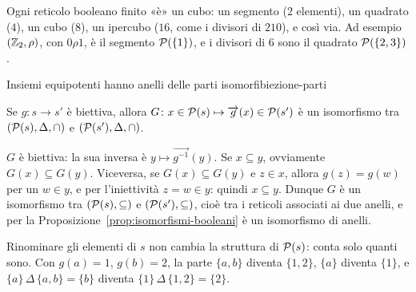 \begin{spiegazione}
    Ogni reticolo booleano finito «è» un cubo: un segmento ($2$ elementi), un quadrato ($4$), un cubo ($8$), un ipercubo ($16$, come i divisori
    di $210$), e così via. Ad esempio $(\mathbb{Z}_2, \rho)$, con $0 \rho 1$, è il segmento $\mathcal{P}(\{1\})$, e i divisori di $6$ sono il quadrato $\mathcal{P}(\{2, 3\})$.
\end{spiegazione}

\begin{concetto}
\begin{Lemma}{Insiemi equipotenti hanno anelli delle parti isomorfi}{biezione-parti}
    \begin{prerequisiti}
    \end{prerequisiti}
    Se $g \colon s \to s'$ è biettiva, allora $G \colon x \in \mathcal{P}(s) \mapsto \overrightarrow{g}(x) \in \mathcal{P}(s')$ è un isomorfismo tra $(\mathcal{P}(s), \Delta, \cap)$ e $(\mathcal{P}(s'), \Delta, \cap)$.
\end{Lemma}
\begin{dimostrazione}
    $G$ è biettiva: la sua inversa è $y \mapsto \overrightarrow{g^{-1}}(y)$. Se $x \subseteq y$, ovviamente $G(x) \subseteq G(y)$. Viceversa, se $G(x) \subseteq G(y)$ e $z \in x$, allora $g(z) = g(w)$ per
    un $w \in y$, e per l'iniettività $z = w \in y$: quindi $x \subseteq y$. Dunque $G$ è un isomorfismo tra $(\mathcal{P}(s), \subseteq)$ e $(\mathcal{P}(s'), \subseteq)$, cioè tra i reticoli
    associati ai due anelli, e per la Proposizione~\ref{prop:isomorfismi-booleani} è un isomorfismo di anelli.
\end{dimostrazione}
\end{concetto}

\begin{spiegazione}
    Rinominare gli elementi di $s$ non cambia la struttura di $\mathcal{P}(s)$: conta solo quanti sono. Con $g(a) = 1$, $g(b) = 2$, la parte $\{a, b\}$ diventa
    $\{1, 2\}$, $\{a\}$ diventa $\{1\}$, e $\{a\} \,\Delta\, \{a, b\} = \{b\}$ diventa $\{1\} \,\Delta\, \{1, 2\} = \{2\}$.
\end{spiegazione}

